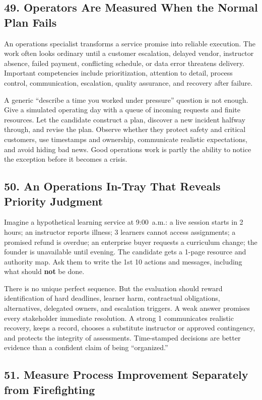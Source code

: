 \subsection*{49. Operators Are Measured When the Normal Plan Fails}

An operations specialist transforms a service promise into reliable execution. The work often looks ordinary until a customer escalation, delayed vendor, instructor absence, failed payment, conflicting schedule, or data error threatens delivery. Important competencies include prioritization, attention to detail, process control, communication, escalation, quality assurance, and recovery after failure.

A generic ``describe a time you worked under pressure'' question is not enough. Give a simulated operating day with a queue of incoming requests and finite resources. Let the candidate construct a plan, discover a new incident halfway through, and revise the plan. Observe whether they protect safety and critical customers, use timestamps and ownership, communicate realistic expectations, and avoid hiding bad news. Good operations work is partly the ability to notice the exception before it becomes a crisis.

\subsection*{50. An Operations In-Tray That Reveals Priority Judgment}

Imagine a hypothetical learning service at 9:00~a.m.: a live session starts in 2 hours; an instructor reports illness; 3 learners cannot access assignments; a promised refund is overdue; an enterprise buyer requests a curriculum change; the founder is unavailable until evening. The candidate gets a 1-page resource and authority map. Ask them to write the 1st 10 actions and messages, including what should \textbf{not} be done.

There is no unique perfect sequence. But the evaluation should reward identification of hard deadlines, learner harm, contractual obligations, alternatives, delegated owners, and escalation triggers. A weak answer promises every stakeholder immediate resolution. A strong 1 communicates realistic recovery, keeps a record, chooses a substitute instructor or approved contingency, and protects the integrity of assessments. Time-stamped decisions are better evidence than a confident claim of being ``organized.''

\subsection*{51. Measure Process Improvement Separately from Firefighting}

